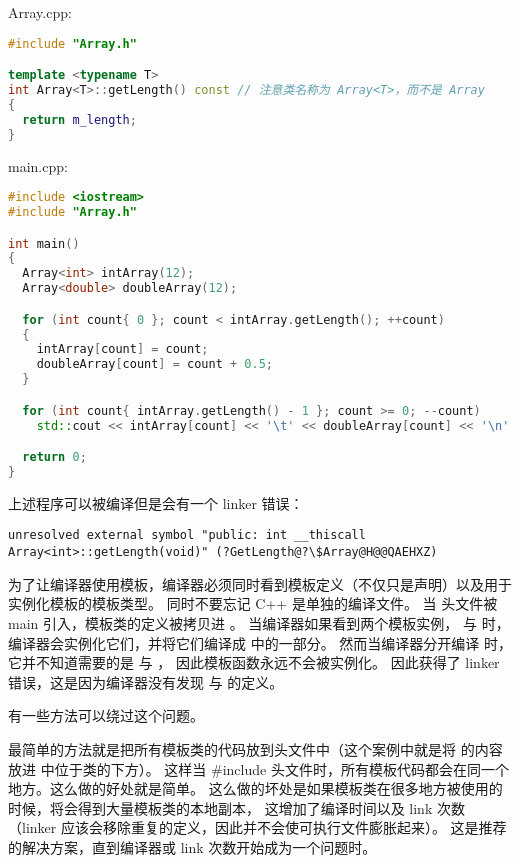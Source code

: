 \documentclass[../../LearnCpp.tex]{subfiles}
\begin{document}
Array.cpp:

\begin{lstlisting}[language=C++]
#include "Array.h"

template <typename T>
int Array<T>::getLength() const // 注意类名称为 Array<T>，而不是 Array
{
  return m_length;
}
\end{lstlisting}

main.cpp:

\begin{lstlisting}[language=C++]
#include <iostream>
#include "Array.h"

int main()
{
  Array<int> intArray(12);
  Array<double> doubleArray(12);

  for (int count{ 0 }; count < intArray.getLength(); ++count)
  {
    intArray[count] = count;
    doubleArray[count] = count + 0.5;
  }

  for (int count{ intArray.getLength() - 1 }; count >= 0; --count)
    std::cout << intArray[count] << '\t' << doubleArray[count] << '\n';

  return 0;
}
\end{lstlisting}

上述程序可以被编译但是会有一个 linker 错误：

\begin{lstlisting}
unresolved external symbol "public: int __thiscall Array<int>::getLength(void)" (?GetLength@?\$Array@H@@QAEHXZ)
\end{lstlisting}

为了让编译器使用模板，编译器必须同时看到模板定义（不仅只是声明）以及用于实例化模板的模板类型。
同时不要忘记 C++ 是单独的编译文件。
当  头文件被 main 引入，模板类的定义被拷贝进 。
当编译器如果看到两个模板实例， 与  时，
编译器会实例化它们，并将它们编译成  中的一部分。
然而当编译器分开编译  时，它并不知道需要的是  与 ，
因此模板函数永远不会被实例化。
因此获得了 linker 错误，这是因为编译器没有发现  与  的定义。

有一些方法可以绕过这个问题。

最简单的方法就是把所有模板类的代码放到头文件中（这个案例中就是将  的内容放进  中位于类的下方）。
这样当 \#include 头文件时，所有模板代码都会在同一个地方。这么做的好处就是简单。
这么做的坏处是如果模板类在很多地方被使用的时候，将会得到大量模板类的本地副本，
这增加了编译时间以及 link 次数（linker 应该会移除重复的定义，因此并不会使可执行文件膨胀起来）。
这是推荐的解决方案，直到编译器或 link 次数开始成为一个问题时。
\end{document}
